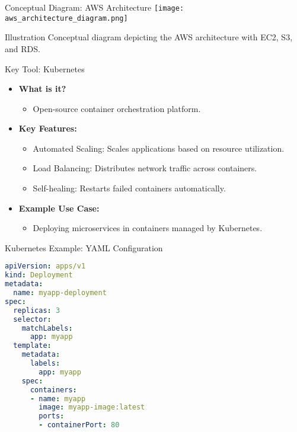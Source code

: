 \documentclass[aspectratio=169]{beamer}
\begin{document}
\begin{frame}{Conceptual Diagram: AWS Architecture}
  \texttt{[image: aws\_architecture\_diagram.png]}
  \begin{block}{Illustration}
    Conceptual diagram depicting the AWS architecture with EC2, S3, and RDS.
  \end{block}
\end{frame}

\begin{frame}{Key Tool: Kubernetes}
  \begin{itemize}
    \item \textbf{What is it?} 
      \begin{itemize}
        \item Open-source container orchestration platform.
      \end{itemize}
    \item \textbf{Key Features:}
      \begin{itemize}
        \item Automated Scaling: Scales applications based on resource utilization.
        \item Load Balancing: Distributes network traffic across containers.
        \item Self-healing: Restarts failed containers automatically.
      \end{itemize}
    \item \textbf{Example Use Case:}
      \begin{itemize}
        \item Deploying microservices in containers managed by Kubernetes.
      \end{itemize}
  \end{itemize}
\end{frame}

\begin{frame}[fragile]{Kubernetes Example: YAML Configuration}
  \begin{lstlisting}[language=yaml]
apiVersion: apps/v1
kind: Deployment
metadata:
  name: myapp-deployment
spec:
  replicas: 3
  selector:
    matchLabels:
      app: myapp
  template:
    metadata:
      labels:
        app: myapp
    spec:
      containers:
      - name: myapp
        image: myapp-image:latest
        ports:
        - containerPort: 80
  \end{lstlisting}
\end{frame}
\end{document}
